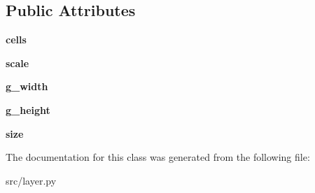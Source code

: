 \subsection*{\-Public \-Attributes}
\begin{DoxyCompactItemize}
\item 
\hypertarget{classsrc_1_1layer_1_1_layer_adcc71aa60154f088a91e05778c2ec1d7}{{\bfseries cells}}\label{classsrc_1_1layer_1_1_layer_adcc71aa60154f088a91e05778c2ec1d7}

\item 
\hypertarget{classsrc_1_1layer_1_1_layer_a89f1ffafdf532fc2cf68eb835fc5e52d}{{\bfseries scale}}\label{classsrc_1_1layer_1_1_layer_a89f1ffafdf532fc2cf68eb835fc5e52d}

\item 
\hypertarget{classsrc_1_1layer_1_1_layer_a1177ea9bed88fb367c91bad8f7a4a384}{{\bfseries g\-\_\-width}}\label{classsrc_1_1layer_1_1_layer_a1177ea9bed88fb367c91bad8f7a4a384}

\item 
\hypertarget{classsrc_1_1layer_1_1_layer_a75f33b5f040b34e7c794e391cef7c5f8}{{\bfseries g\-\_\-height}}\label{classsrc_1_1layer_1_1_layer_a75f33b5f040b34e7c794e391cef7c5f8}

\item 
\hypertarget{classsrc_1_1layer_1_1_layer_abfd5920bd67e111cfdf53262bb6ee491}{{\bfseries size}}\label{classsrc_1_1layer_1_1_layer_abfd5920bd67e111cfdf53262bb6ee491}

\end{DoxyCompactItemize}


\-The documentation for this class was generated from the following file\-:\begin{DoxyCompactItemize}
\item 
src/layer.\-py\end{DoxyCompactItemize}
